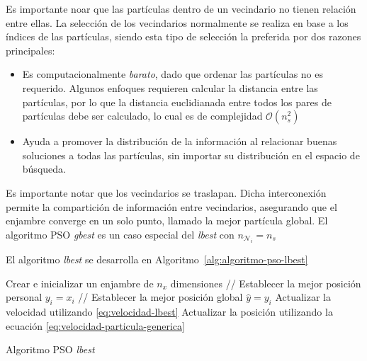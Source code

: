 \documentclass{article}
\begin{document}
Es importante noar que las partículas dentro de un vecindario no tienen relación entre ellas.
La selección de los vecindarios normalmente se realiza en base a los índices de las partículas, siendo esta tipo de selección la preferida por dos razones principales:
\begin{itemize}
	\item Es computacionalmente \emph{barato}, dado que ordenar las partículas no es requerido. 
	Algunos enfoques requieren calcular la distancia entre las partículas, por lo que la distancia euclidianada entre todos los pares de partículas debe ser calculado, lo cual es de complejidad $\mathcal{O}(n_s^2)$
	\item Ayuda a promover la distribución de la información al relacionar buenas soluciones a todas las partículas, sin importar su distribución en el espacio de búsqueda.
\end{itemize}
Es importante notar que los vecindarios se traslapan.
Dicha interconexión permite la compartición de información entre vecindarios, asegurando que el enjambre converge en un solo punto, llamado la mejor partícula global.
El algoritmo PSO \emph{gbest} es un caso especial del \emph{lbest} con $n_{\mathcal{N}_i} = n_s$

El algoritmo \emph{lbest} se desarrolla en Algoritmo~\ref{alg:algoritmo-pso-lbest}
\begin{algorithm} 
\begin{algorithmic}[1] 
\STATE Crear e inicializar un enjambre de $n_x$ dimensiones
\REPEAT
		\STATE // Establecer la mejor posición personal
			\STATE $y_i = x_i$
		\ENDIF
		\STATE // Establecer la mejor posición global 
			\STATE $\hat{y} = y_i$
		\ENDIF
	\ENDFOR
		\STATE Actualizar la velocidad utilizando \ref{eq:velocidad-lbest}
		\STATE Actualizar la posición utilizando la ecuación \ref{eq:velocidad-particula-generica}
	\ENDFOR
{}
\end{algorithmic} 
\caption{Algoritmo PSO \emph{lbest}} 
\label{alg:algoritmo-pso-lbest}
\end{algorithm}
\end{document}
